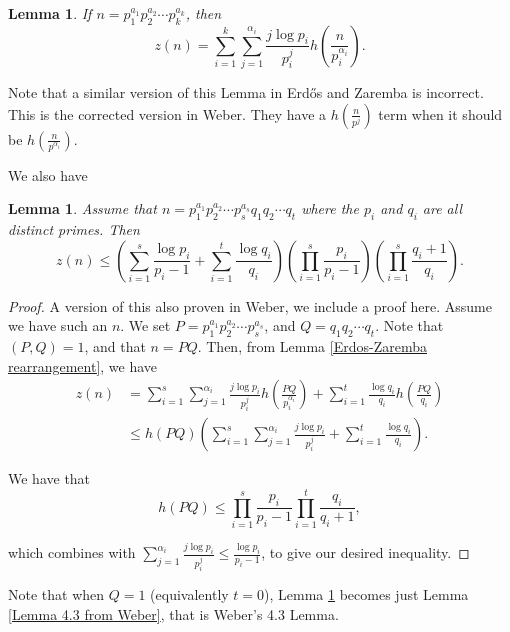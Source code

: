 \documentclass{article}
\newtheorem{lemma}[theorem]{Lemma}
\begin{document}
\begin{lemma} If $n=p_1^{a_1}p_2^{a_2} \cdots p_k^{a_k}$, then 
\begin{equation}\label{Erdos-Zaremba rearrangement} z(n) = \sum_{i=1}^k \sum_{j=1}^{\alpha_i} \frac{j \log p_i}{p_i^j}h\left(\frac{n}{p_i^{\alpha_i}}\right). \end{equation} 
\end{lemma}

Note that a similar version of this Lemma in Erd\H{o}s and Zaremba is incorrect. This is the corrected version in Weber. They have a $h(\frac{n}{p^j})$ term when it should be $h(\frac{n}{p^{\alpha_i}})$.

We also have 
\begin{lemma} Assume that $n=p_1^{a_1}p_2^{a_2} \cdots p_s^{a_s}q_1q_2\cdots q_t$ where the $p_i$ and $q_i$ are all distinct primes. Then $$z(n) \leq \left(\sum_{i=1}^s \frac{\log p_i}{p_i -1} + \sum_{i=1}^t \frac{\log q_i}{q_i}\right)\left(\prod_{i=1}^s \frac{p_i}{p_i-1}\right)\left(\prod_{i=1}^s \frac{q_i+1}{q_i}\right). $$ \label{Tightened Weber 4.3} 
\end{lemma}
\begin{proof} A version of this also proven in Weber, we include a proof here. Assume we have such an $n$. We set $P=p_1^{a_1}p_2^{a_2} \cdots p_s^{a_s}$, and $Q=q_1q_2\cdots q_t$. Note that $(P,Q)=1$, and that $n=PQ$. Then, from Lemma \ref{Erdos-Zaremba rearrangement}, 
we have \begin{equation} \label{Multistage inequality}
\begin{split}
z(n) & =  \sum_{i=1}^s \sum_{j=1}^{\alpha_i} \frac{j \log p_i}{p_i^j}h\left(\frac{PQ}{p_i^{\alpha_i}}\right) + \sum_{i=1}^t \frac{\log q_i}{q_i}h\left(\frac{PQ}{q_i}\right) \\
 & \leq h(PQ)\left(\sum_{i=1}^s \sum_{j=1}^{\alpha_i} \frac{j \log p_i}{p_i^j} + \sum_{i=1}^t \frac{\log q_i}{q_i}\right). 
\end{split}
\end{equation}


We have that $$h(PQ) \leq \prod_{i=1}^s \frac{p_i}{p_i-1} \prod_{i=1}^t \frac{q_i}{q_i+1},$$

which combines with $\sum_{j=1}^{\alpha_i} \frac{j \log p_i}{p_i^j} \leq \frac{ \log p_i}{p_i-1}$, to give our desired inequality.
\end{proof}

Note that when $Q=1$ (equivalently $t=0$), Lemma \ref{Tightened Weber 4.3} becomes just Lemma \ref{Lemma 4.3 from Weber}, that is Weber's 4.3 Lemma. 
\end{document}
